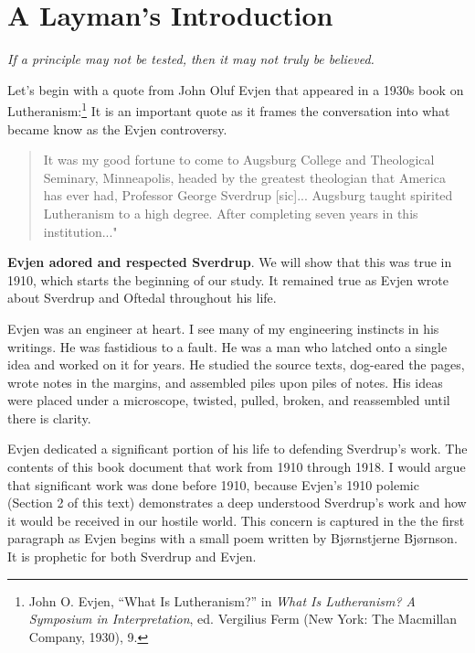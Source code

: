 \section{A Layman's Introduction}


\textit{If a principle may not be tested, then it may not truly be believed.}


Let's begin with a quote from John Oluf Evjen that appeared in a 1930s book on Lutheranism:\footnote{John O. Evjen, ``What Is Lutheranism?'' in \textit{What Is Lutheranism? A Symposium in Interpretation}, ed. Vergilius Ferm (New York: The Macmillan Company, 1930), 9.} It is an important quote as it frames the conversation into what became know as the Evjen controversy. 

\begin{quote}

It was my good fortune to come to Augsburg College and Theological Seminary, Minneapolis, headed by the greatest theologian that America has ever had, Professor George Sverdrup [sic]... Augsburg taught spirited Lutheranism to a high degree. After completing seven years in this institution..."

\end{quote}

\textbf{Evjen adored and respected Sverdrup}. We will show that this was true in 1910, which starts the beginning of our study. It remained true as Evjen wrote about Sverdrup and Oftedal throughout his life. 

Evjen was an engineer at heart. I see many of my engineering instincts in his writings. He was fastidious to a fault. He was a man who latched onto a single idea and worked on it for years. He studied the source texts, dog-eared the pages, wrote notes in the margins, and assembled piles upon piles of notes. His ideas were placed under a microscope, twisted, pulled, broken, and reassembled until there is clarity.

Evjen dedicated a significant portion of his life to defending Sverdrup's work. The contents of this book document that work from 1910 through 1918. I would argue that significant work was done before 1910, because Evjen's 1910 polemic (Section 2 of this text) demonstrates a deep understood Sverdrup's work and how it would be received in our hostile world. This concern is captured in the the first paragraph as Evjen begins with a small poem written by Bjørnstjerne Bjørnson. It is prophetic for both Sverdrup and Evjen. 

